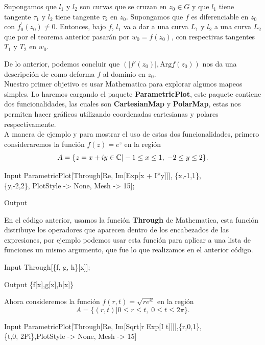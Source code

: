\begin{coro}
	Supongamos que $l_1$ y $l_2$ son curvas que se cruzan en $z_0\in G$ y que $l_1$ tiene tangente $\tau_1$ y $l_2$ tiene tangente $\tau_2$ en $z_0$. Supongamos que $f$ es diferenciable en $z_0$ con $f^{'}_0(z_0)\neq 0$. Entonces, bajo $f$, $l_1$ va a dar a una curva $L_1$ y $l_2$ a una curva $L_2$ que por el teorema  anterior pasarán por $w_0 = f(z_0)$, con respectivas tangentes $T_1$ y $T_2$ en $w_0$.
\end{coro}
De lo anterior, podemos concluir que $(|f'(z_0)|,\mbox{Arg}f(z_0))$ nos da una descripción de como deforma $f$ al dominio en $z_0$.\\
Nuestro primer objetivo es usar Mathematica para explorar algunos mapeos simples. Lo haremos cargando el paquete \textbf{ParametricPlot}, este paquete contiene dos funcionalidades, las cuales son  \textbf{CartesianMap} y \textbf{PolarMap}, estas  nos permiten hacer gráficos utilizando coordenadas cartesianas y polares respectivamente. \\
A manera de ejemplo y para mostrar el uso de estas dos funcionalidades, primero consideraremos la función $f(z)=e^{z}$ en la región $$A=\{z=x+iy\in\mathbb{C} | -1\leq x\leq 1, \; -2\leq y\leq 2\}.$$

\begin{mmaCell}{Input}
	 ParametricPlot[Through[{Re, Im}[Exp[x + I*y]]], \{x,-1,1\},\\\{y,-2,2\},  PlotStyle -> None, Mesh -> 15];
\end{mmaCell}


\begin{mmaCell}[moregraphics={moreig={scale=0.4}}]{Output}
\end{mmaCell}
En el código anterior, usamos la función \textbf{Through} de Mathematica, esta función distribuye los operadores que aparecen dentro de los encabezados de las expresiones, por ejemplo podemos usar esta función para aplicar a una lista de funciones un mismo argumento, que fue lo que realizamos en el anterior código.
\begin{mmaCell}{Input}
	 Through[\{f, g, h\}[x]];
\end{mmaCell}
\begin{mmaCell}{Output}
	 \{f[x],g[x],h[x]\}
\end{mmaCell}
Ahora consideremos la función $f(r,t)=\sqrt{re^{it}}$ en la región
$$A=\{(r,t)| 0\leq r\leq t,\; 0\leq t\leq 2\pi \}.$$

\begin{mmaCell}{Input}
	 ParametricPlot[Through[{Re, Im}[Sqrt[r Exp[I t]]]],\{r,0,1\},\\\{t,0, 2Pi\},PlotStyle -> None, Mesh -> 15]
\end{mmaCell}

